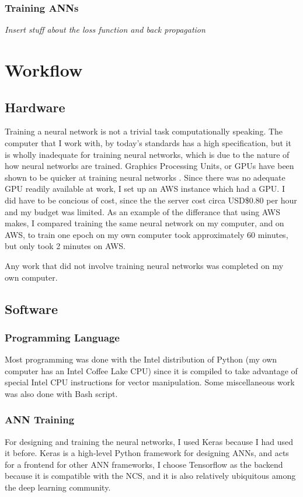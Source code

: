           \subsubsection{Training ANNs}
          {\slshape Insert stuff about the loss function and back propagation}

\section{Workflow}
    \subsection{Hardware}
    Training a neural network is not a trivial task computationally speaking. The computer that I work with, by today's standards has a high specification, but it is wholly inadequate for training neural networks, which is due to the nature of how neural networks are trained. Graphics Processing Units, or GPUs have been shown to be quicker at training neural networks \cite{OH20041311}. Since there was no adequate GPU readily available at work, I set up an AWS instance which had a GPU. I did have to be concious of cost, since the the server cost circa USD\$0.80 per hour and my budget was limited. As an example of the differance that using AWS makes, I compared training the same neural network on my computer, and on AWS, to train one epoch on my own computer took approximately 60 minutes, but only took 2 minutes on AWS.

    Any work that did not involve training neural networks was completed on my own computer.

    \subsection{Software}
        \subsubsection{Programming Language}
        Most programming was done with the Intel distribution of Python (my own computer has an Intel Coffee Lake CPU) since it is compiled to take advantage of special Intel CPU instructions for vector manipulation. Some miscellaneous work was also done with Bash script.

        \subsubsection{ANN Training}
        For designing and training the neural networks, I used Keras \cite{chollet2015keras} because I had used it before. Keras is a high-level Python framework for designing ANNs, and acts for a frontend for other ANN frameworks, I choose Tensorflow \cite{tensorflow2015-whitepaper} as the backend because it is compatible with the NCS, and it is also relatively ubiquitous among the deep learning community.

